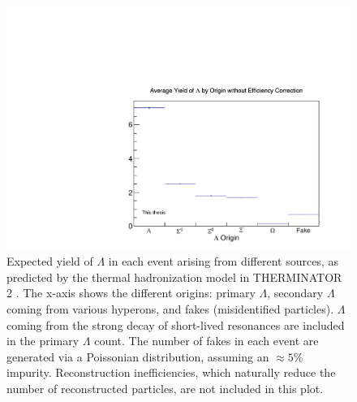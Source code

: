 \begin{figure}[hbtp]
\includegraphics[width=36pc]{Figures/YieldAndEff/2016-08-06-LambdaYieldsNoEfficiency.pdf}
\caption[$\Lambda$ yields from THERMINATOR 2 without efficiency corrections]{
Expected yield of $\Lambda$ in each event arising from different sources, as predicted by the thermal hadronization model in THERMINATOR 2 \cite{Chojnacki:2011hb}. The x-axis shows the different origins: primary $\Lambda$, secondary $\Lambda$ coming from various hyperons, and fakes (misidentified particles).  $\Lambda$ coming from the strong decay of short-lived resonances are included in the primary $\Lambda$ count. The number of fakes in each event are generated via a Poissonian distribution, assuming an $\approx 5$\% impurity. Reconstruction inefficiencies, which naturally reduce the number of reconstructed particles, are not included in this plot.
}
\label{fig:LambdaYieldsNoEfficiency}
\end{figure}


